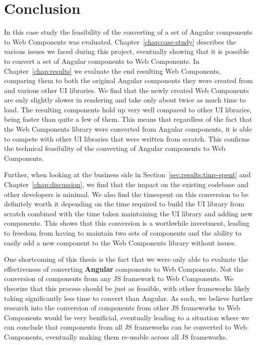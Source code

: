 \chapter{Conclusion}

In this case study the feasibility of the converting of a set of Angular components to Web Components was evaluated. Chapter~\ref{chap:case-study} describes the various issues we faced during this project, eventually showing that it is possible to convert a set of Angular components to Web Components. In Chapter~\ref{chap:results} we evaluate the end resulting Web Components, comparing them to both the original Angular components they were created from and various other UI libraries. We find that the newly created Web Components are only slightly slower in rendering and take only about twice as much time to load. The resulting components hold up very well compared to other UI libraries, being faster than quite a few of them. This means that regardless of the fact that the Web Components library were converted from Angular components, it is able to compete with other UI libraries that were written from scratch. This confirms the technical feasibility of the converting of Angular components to Web Components.

Further, when looking at the business side in Section~\ref{sec:results:time-spent} and Chapter~\ref{chap:discussion}, we find that the impact on the existing codebase and other developers is minimal. We also find the timespent on this conversion to be definitely worth it depending on the time required to build the UI library from scratch combined with the time taken maintaining the UI library and adding new components. This shows that this conversion is a worthwhile investment, leading to freedom from having to maintain two sets of components and the ability to easily add a new component to the Web Components library without issues.

One shortcoming of this thesis is the fact that we were only able to evaluate the effectiveness of converting \textbf{Angular} components to Web Components. Not the conversion of components from any JS framework to Web Components. We theorize that this process should be just as feasible, with other frameworks likely taking significantly less time to convert than Angular. As such, we believe further research into the conversion of components from other JS frameworks to Web Components would be very benificial, eventually leading to a situation where we can conclude that components from all JS frameworks can be converted to Web Components, eventually making them re-usable across all JS frameworks.
